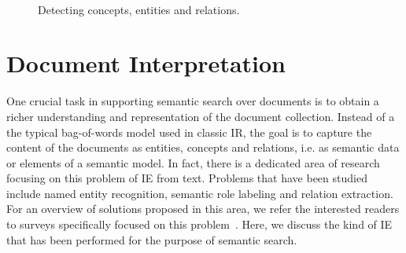 
 
\begin{figure}[htb]
	\centering
  ~ %
  \caption{Detecting concepts, entities and relations.}
  \label{fig:extraction}
  \vspace{-0.5cm}
\end{figure}

\section{Document Interpretation}\label{sec:content}
	
One crucial task in supporting semantic search over documents is to obtain a richer understanding and representation of the document collection. Instead of a the typical bag-of-words model used in classic IR, the goal is to capture the content of the documents as entities, concepts and relations, i.e. as semantic data or elements of a semantic model. In fact, there is a dedicated area of research focusing on this problem of IE from text. Problems that have been studied include named entity recognition, semantic role labeling and relation extraction. For an overview of solutions proposed in this area, we refer the interested readers to surveys specifically focused on this problem~\cite{DBLP:journals/tkde/ChangKGS06}. Here, we discuss the kind of IE that has been performed for the purpose of semantic search. 

